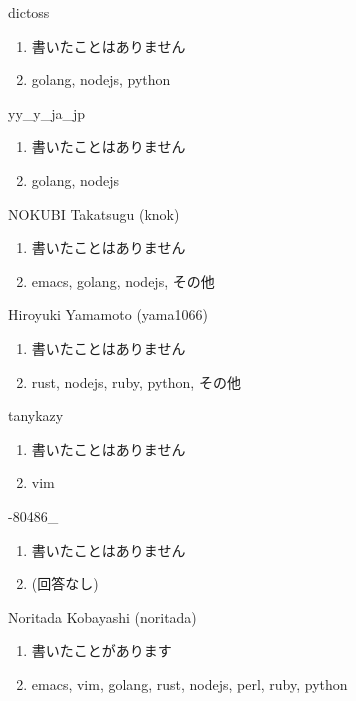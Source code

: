 \begin{prework}{ dictoss }
  \begin{enumerate}
  \item 書いたことはありません
  \item golang, nodejs, python
  \end{enumerate}
\end{prework}

\begin{prework}{ yy\_y\_ja\_jp }
  \begin{enumerate}
  \item 書いたことはありません
  \item golang, nodejs
  \end{enumerate}
\end{prework}

\begin{prework}{ NOKUBI Takatsugu (knok) }
  \begin{enumerate}
  \item 書いたことはありません
  \item emacs, golang, nodejs, その他
  \end{enumerate}
\end{prework}

\begin{prework}{ Hiroyuki Yamamoto (yama1066) }
  \begin{enumerate}
  \item 書いたことはありません
  \item rust, nodejs, ruby, python, その他
  \end{enumerate}
\end{prework}

\begin{prework}{ tanykazy }
  \begin{enumerate}
  \item 書いたことはありません
  \item vim
  \end{enumerate}
\end{prework}

\begin{prework}{ -80486\_ }
  \begin{enumerate}
  \item 書いたことはありません
  \item (回答なし)
  \end{enumerate}
\end{prework}

\begin{prework}{ Noritada Kobayashi (noritada) }
  \begin{enumerate}
  \item 書いたことがあります
  \item emacs, vim, golang, rust, nodejs, perl, ruby, python
  \end{enumerate}
\end{prework}

